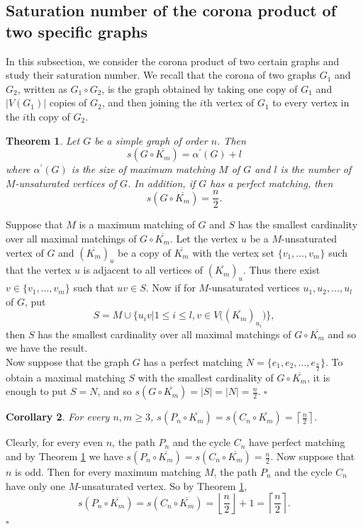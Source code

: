 \documentclass[11pt]{article}
\newtheorem{theorem}{Theorem}[section]
\newtheorem{corollary}[theorem]{Corollary}
\newcommand{\proof}{\noindent{\bf Proof.\ }}
\newcommand{\qed}{\hfill $\square$\medskip}
\begin{document}
\subsection{Saturation number of the corona product of two specific graphs} 
  
In this subsection, we consider the corona product of two certain graphs and study their saturation number. We recall that the corona of two graphs $G_1$ and $G_2$, written as ${G_1}\circ{G_2}$, is the graph obtained by taking one copy of $G_1$ and $|V(G_1)|$ copies of $G_2$, and then joining the $i$th vertex of $G_1$ to every vertex in the $i$th copy of $G_2$. 

\begin{theorem}\label{corona}
Let $G$ be a simple graph of order $n$. Then 
$$s(G\circ \overline{K_m})=\alpha^{\prime}(G)+l$$ 
where $\alpha^{\prime}(G)$ is the size of maximum matching $M$ of  $G$ and $l$ is the number of $M$-unsaturated vertices of $G$. In addition, if $G$ has a perfect matching, then 
$$s(G\circ \overline{K_m})=\frac{n}{2}.$$
\end{theorem}

\proof 
Suppose that $M$ is a maximum matching of $G$ and $S$ has the smallest cardinality over all maximal matchings of 
$G\circ \overline{K_m}$. Let the vertex $u$ be a $M$-unsaturated vertex of $G$ and $(\overline{K_m})_u$ be a copy of 
$\overline{K_m}$  with the vertex set $\{v_1,...,v_m\}$ such that the vertex $u$ is adjacent to all vertices of 
$(\overline{K_m})_u$. Thus there exist $v\in \{v_1,...,v_m\}$ such that $uv\in S$. Now if for $M$-unsaturated vertices $u_1, u_2, ..., u_l$ of $G$, put 
$$S=M\cup\big\{u_iv|1\leq i\leq l, v\in V\big({(\overline{K_m})}_{u_i}\big)\big\},$$ then $S$ has the smallest cardinality over all maximal matchings of $G\circ \overline{K_m}$ and so we have the result. \\
Now suppose that the graph $G$ has a perfect matching $N=\{e_1, e_2, ..., e_{\frac{n}{2}}\}$. To obtain a maximal matching $S$ with the smallest cardinality of $G\circ \overline{K_m}$, it is enough to put $S=N$, and so 
$s(G\circ \overline{K_m})=|S|=|N|=\frac{n}{2}$. 
\qed

\begin{corollary} 
For every $n,m\geq 3$, $s({P_n}\circ \overline{K_m})=s({C_n}\circ \overline{K_m})=\left\lceil{\frac{n}{2}}\right\rceil$. 
\end{corollary} 

\proof 
Clearly, for every even $n$, the path $P_n$ and the cycle $C_n$ have perfect matching and by Theorem \ref{corona} we have $s({P_n}\circ \overline{K_m})=s({C_n}\circ \overline{K_m})=\frac{n}{2}$. Now suppose that $n$ is odd. Then for every maximum matching $M$, the path $P_n$ and the cycle $C_n$ have only one $M$-unsaturated vertex. So by 
Theorem \ref{corona}, $$s({P_n}\circ \overline{K_m})=s({C_n}\circ \overline{K_m})=\left\lfloor{\frac{n}{2}}
\right\rfloor+1=\left\lceil{\frac{n}{2}}\right\rceil.$$    
\qed
\end{document}
